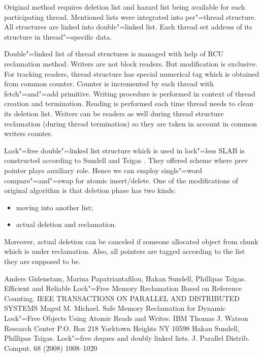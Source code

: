 \documentclass[10pt, a5paper]{article}
\begin{document}
Original method requires deletion list and hazard list being available for each participating thread. Mentioned lists were integrated into per"=thread structure. All structures are linked into double"=linked list. Each thread set address of its structure in thread"=specific data.

Double"=linked list of thread structures is managed with help of RCU reclamation method. Writers are not block readers. But modification is exclusive. For tracking readers, thread structure has special numerical tag which is obtained from common counter. Counter is incremented by each thread with fetch"=and"=add primitive. Writing procedure is \linebreak performed in context of thread creation and termination. Reading is performed each time thread needs to clean its deletion list. Writers can be readers as well during thread structure reclamation (during thread termination) so they are taken in account in common writers counter.

Lock"=free double"=linked list structure which is used in lock"=less SLAB is constructed according to Sundell and Tsigas \cite{Matyl3}. They offered scheme where prev pointer plays auxiliary role. Hence we can employ single"=word compare"=and"=swap for atomic insert/delete. One of the \linebreak modifications of original algorithm is that deletion phase has two kinds:

\begin{itemize}
  \item moving into another list;
  \item actual deletion and reclamation.
\end{itemize}

Moreover, actual deletion can be canceled if someone allocated object from chunk which is under reclamation. Also, all pointers are tagged according to the list they are supposed to be.

\begin{thebibliography}{9}

 Anders Gidenstam, Marina Papatriantafilou, Hakan Sundell, Phillipas Tsigas. Efficient and Reliable Lock"=Free Memory Reclamation Based on Reference Counting. IEEE TRANSACTIONS ON PARALLEL AND DISTRIBUTED SYSTEMS
 Maged M. Michael. Safe Memory Reclamation for Dynamic Lock"=Free Objects Using Atomic Reads and Writes. IBM Thomas J. Watson Research Center P.O. Box 218 Yorktown Heights NY 10598
 Hakan Sundell, Phillipas Tsigas. Lock"=free deques and doubly linked lists. J. Parallel Distrib. Comput. 68 (2008) 1008–1020
\end{thebibliography}
\end{document}
